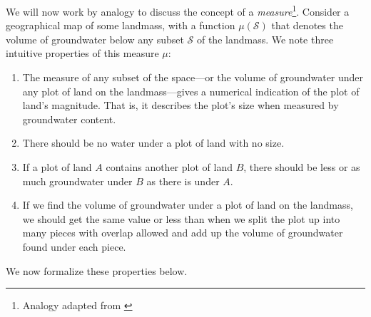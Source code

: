 We will now work by analogy to discuss the concept of a \textit{measure}\footnote{Analogy adapted from \citep{mandelbrotmultifractal}}. Consider a geographical map of some landmass, with a function $ \mu(\mathcal{S}) $ that denotes the volume of groundwater below any subset $ \mathcal{S} $ of the landmass. We note three intuitive properties of this measure $ \mu $:\begin{enumerate}
\item The measure of any subset of the space---or the volume of groundwater under any plot of land on the landmass---gives a numerical indication of the plot of land's magnitude. That is, it describes the plot's size when measured by groundwater content.
\item\label{measureofanullset} There should be no water under a plot of land with no size. 
\item\label{measureofsubsets} If a plot of land $ A $ contains another plot of land $ B $, there should be less or as much groundwater under $B$ as there is under $A$. 
\item\label{measureaddition} If we find the volume of groundwater under a plot of land on the landmass, we should get the same value or less than when we split the plot up into many pieces with overlap allowed and add up the volume of groundwater found under each piece. 
\end{enumerate}
We now formalize these properties below.

